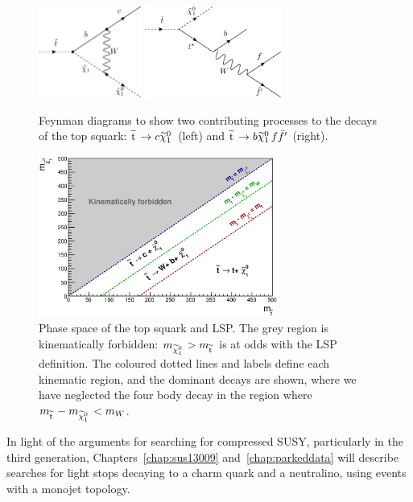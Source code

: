\begin{figure}[t!]
  \begin{center}
  \includegraphics[width=0.3\textwidth]{Figures/theory/stop2bodydecay.pdf}
  \includegraphics[width=0.4\textwidth]{Figures/theory/stop4bodydecay.pdf}
  \caption{Feynman diagrams to show two contributing processes to the decays of the top squark: $\widetilde{{\rm t}}\, \rightarrow c \widetilde{\chi}^{0}_{1}\,$ (left) and $\widetilde{{\rm t}}\, \rightarrow b \widetilde{\chi}^{0}_{1}\, f \bar{f}'$ (right).}
  \label{fig:stopDecays}
  \end{center}
\end{figure}
 

\begin{figure}[t!]
  \begin{center}
  \includegraphics[width=0.7\textwidth]{Figures/theory/stopMassPlane}
  \caption{Phase space of the top squark and LSP. The grey region is kinematically forbidden: 
  $m_{\widetilde{\chi}^{0}_{1}\,} > m_{\widetilde{{\rm t}}\,}$ is at odds with the \ac{LSP} definition. 
  The coloured dotted lines and labels define each kinematic region, and the dominant \sTop decays are shown, where we have neglected the four body decay in the region where $m_{\widetilde{{\rm t}}\,} - m_{\widetilde{\chi}^{0}_{1}\,} < m_{W}$.}
  \label{fig:stopDecayMassPlane}
  \end{center}
\end{figure}

In light of the arguments for searching for compressed \ac{SUSY}, particularly in the third generation, 
Chapters~\ref{chap:sus13009} and~\ref{chap:parkeddata} will describe searches for light stops decaying to a charm quark and a neutralino, using events with a monojet topology.
